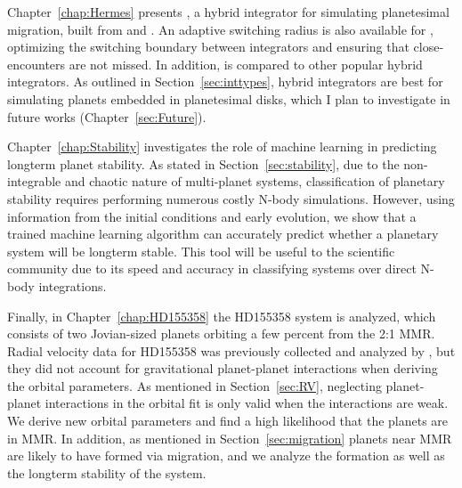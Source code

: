Chapter~\ref{chap:Hermes} presents \hermes, a hybrid integrator for simulating planetesimal migration, built from \ias \citep{Rein2015a} and \whfast \citep{Rein2015b}. 
An adaptive switching radius is also available for \hermes, optimizing the switching boundary between integrators and ensuring that close-encounters are not missed.
In addition, \hermes is compared to other popular hybrid integrators. 
As outlined in Section~\ref{sec:inttypes}, hybrid integrators are best for simulating planets embedded in planetesimal disks, which I plan to investigate in future works (Chapter~\ref{sec:Future}). 

Chapter~\ref{chap:Stability} investigates the role of machine learning in predicting longterm planet stability. 
As stated in Section~\ref{sec:stability}, due to the non-integrable and chaotic nature of multi-planet systems, classification of planetary stability requires performing numerous costly N-body simulations. 
However, using information from the initial conditions and early evolution, we show that a trained machine learning algorithm can accurately predict whether a planetary system will be longterm stable.  
This tool will be useful to the scientific community due to its speed and accuracy in classifying systems over direct N-body integrations.  

Finally, in Chapter~\ref{chap:HD155358} the HD155358 system is analyzed, which consists of two Jovian-sized planets orbiting a few percent from the 2:1 MMR. 
Radial velocity data for HD155358 was previously collected and analyzed by \citet{Robertson2012}, but they did not account for gravitational planet-planet interactions when deriving the orbital parameters.
As mentioned in Section~\ref{sec:RV}, neglecting planet-planet interactions in the orbital fit is only valid when the interactions are weak. 
We derive new orbital parameters and find a high likelihood that the planets are in MMR.
In addition, as mentioned in Section~\ref{sec:migration} planets near MMR are likely to have formed via migration, and we analyze the formation as well as the longterm stability of the system. 
